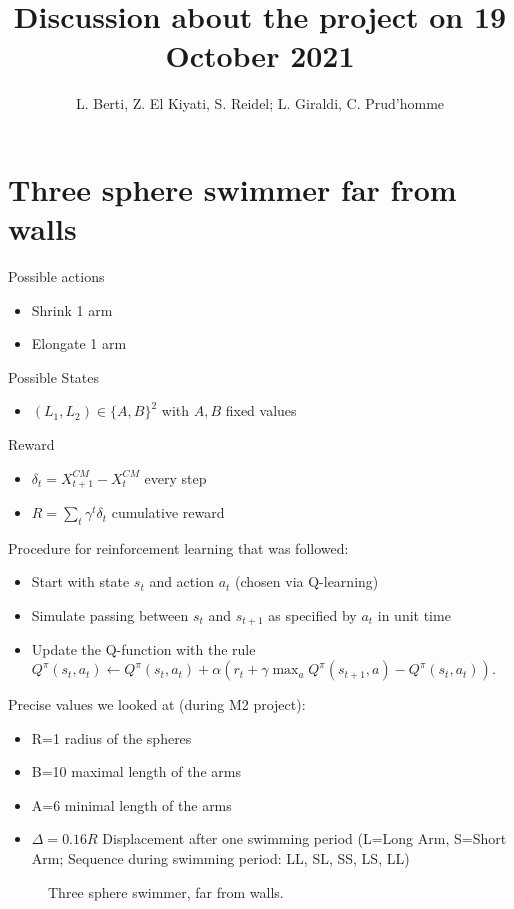 \documentclass{article}
\title{Discussion about the project on 19 October 2021}
\author{L. Berti, Z. El Kiyati, S. Reidel; L. Giraldi, C. Prud'homme}
\begin{document}
	\maketitle
	\section{Three sphere swimmer far from walls}
	Possible actions
	\begin{itemize}
		\item Shrink 1 arm
		\item Elongate 1 arm
	\end{itemize}
	Possible States
	\begin{itemize}
		\item $(L_1,L_2) \in \{A,B\}^2$ with $A, B$ fixed values
	\end{itemize}
	Reward
	\begin{itemize}
		\item $\delta_t = X^{CM}_{t+1}-X_t^{CM}$ every step
		\item $R = \sum_t \gamma^t\delta_t$ cumulative reward
	\end{itemize}
	Procedure for reinforcement learning that was followed:
	\begin{itemize}
		\item Start with state $s_t$ and action $a_t$ (chosen via Q-learning)
		\item Simulate passing between $s_t$ and $s_{t+1}$ as specified by $a_t$ in unit time
		\item Update the Q-function with the rule $Q^\pi(s_t,a_t) \leftarrow Q^\pi(s_t,a_t) + \alpha(r_t + \gamma \max_a Q^\pi(s_{t+1},a)-Q^\pi(s_{t},a_{t})).$
	\end{itemize}
	Precise values we looked at (during M2 project): 
	\begin{itemize}
		\item R=1 radius of the spheres
		\item B=10 maximal length of the arms
		\item A=6 minimal length of the arms
		\item $\Delta=0.16R$ Displacement after one swimming period (L=Long Arm, S=Short Arm; Sequence during swimming period: LL, SL, SS, LS, LL)
	\end{itemize}
\begin{figure}
	\centering
\caption{Three sphere swimmer, far from walls.}
\end{figure}
\end{document}
